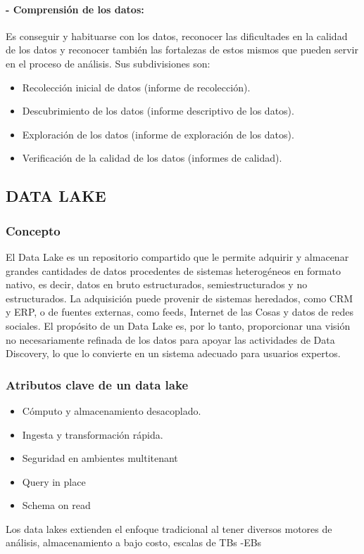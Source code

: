 \documentclass[twoside,twocolumn]{article}
\begin{document}
\paragraph{- Comprensión de los datos:}
Es conseguir y habituarse con los datos, 
reconocer las dificultades en la calidad de los datos y reconocer también 
las fortalezas de estos mismos que pueden servir en el proceso de 
análisis. Sus subdivisiones son: 

\begin{itemize}
    \item Recolección inicial de datos (informe de recolección). 
    \item Descubrimiento de los datos (informe descriptivo de los datos).
    \item Exploración de los datos (informe de exploración de los datos).
    \item Verificación de la calidad de los datos (informes de calidad). 
    
\end{itemize}
\subsection{DATA LAKE}
\subsubsection{Concepto}
El Data Lake es un repositorio compartido que le permite adquirir y almacenar grandes cantidades de datos procedentes de sistemas heterogéneos en formato nativo, es decir, datos en bruto estructurados, semiestructurados y no estructurados. La adquisición puede provenir de sistemas heredados, como CRM y ERP, o de fuentes externas, como feeds, Internet de las Cosas y datos de redes sociales.
El propósito de un Data Lake es, por lo tanto, proporcionar una visión no necesariamente refinada de los datos para apoyar las actividades de Data Discovery, lo que lo convierte en un sistema adecuado para usuarios expertos.

\subsubsection{Atributos clave de un data lake}
\begin{itemize}
    \item  Cómputo y almacenamiento desacoplado.
    \item  Ingesta y transformación rápida.
    \item   Seguridad en ambientes multitenant
    \item   Query in place
    \item  Schema on read
\end{itemize}
Los data lakes extienden el enfoque tradicional al tener diversos motores de análisis, almacenamiento a bajo costo, escalas de TBs -EBs
\end{document}
